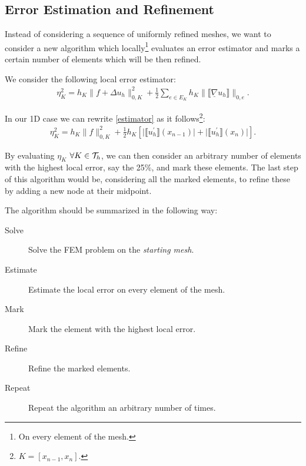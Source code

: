 \subsection{Error Estimation and Refinement}

Instead of considering a sequence of uniformly refined meshes, we want to consider a new algorithm which locally\footnote{On every element of the mesh.} evaluates an error estimator and marks a certain number of elements which will be then refined.

We consider the following local error estimator:
\begin{gather} \label{estimator}
	\eta_K^2 = h_K \lVert f + \Delta u_h \rVert_{0, K}^2 + \frac{1}{2} \sum_{e \in E_K} h_K \lVert \llbracket \underline{\nabla} u_h \rrbracket \rVert_{0, e}.
\end{gather}

In our 1D case we can rewrite \ref{estimator} as it follows\footnote{$K = [x_{n - 1}, x_n]$.}:
\begin{gather}
	\eta_K^2 = h_K \lVert f \rVert_{0, K}^2 + \frac{1}{2} h_K \left[ \lvert \llbracket u_h^\prime \rrbracket (x_{n - 1}) \rvert + \lvert \llbracket u_h^\prime \rrbracket (x_n) \rvert \right].
\end{gather}

By evaluating $\eta_K$ $\forall K \in \mathcal{T}_h$, we can then consider an arbitrary number of elements with the highest local error, say the 25\%, and mark these elements. The last step of this algorithm would be, considering all the marked elements, to refine these by adding a new node at their midpoint.

The algorithm should be summarized in the following way:
\begin{description}
	\item[Solve] Solve the FEM problem on the \textit{starting mesh}.
	\item[Estimate] Estimate the local error on every element of the mesh.
	\item[Mark] Mark the element with the highest local error.
	\item[Refine] Refine the marked elements.  
	\item[Repeat] Repeat the algorithm an arbitrary number of times. 
\end{description}